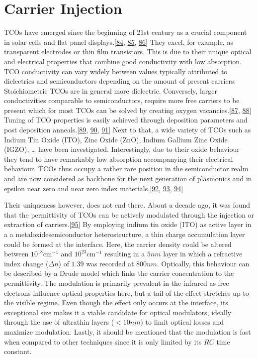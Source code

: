 \documentclass[a4paper,10pt,english,openany,oneside]{jupyterBook}
\begin{document}
\section{Carrier Injection}
\label{\detokenize{sota:carrier-injection}}
\sphinxAtStartPar
TCOs have emerged since the beginning of 21st century as a crucial component in solar cells and flat panel displays.{[}\hyperlink{cite.bib:id444}{84}, \hyperlink{cite.bib:id446}{85}, \hyperlink{cite.bib:id448}{86}{]} They excel, for example, as transparent electrodes or thin film transistors. This is due to their unique optical and electrical properties that combine good conductivity with low absorption. TCO conductivity can vary widely between values typically attributed to dielectrics and semiconductors depending on the amount of present carriers. Stoichiometric TCOs are in general more dielectric. Conversely, larger conductivities comparable to semiconductors, require more free carriers to be present which for most TCOs can be solved by creating oxygen vacancies.{[}\hyperlink{cite.bib:id339}{87}, \hyperlink{cite.bib:id341}{88}{]} Tuning of TCO properties is easily achieved through deposition parameters and post deposition anneals.{[}\hyperlink{cite.bib:id338}{89}, \hyperlink{cite.bib:id498}{90}, \hyperlink{cite.bib:id334}{91}{]} Next to that, a wide variety of TCOs such as Indium Tin Oxide (ITO), Zinc Oxide (ZnO), Indium Gallium Zinc Oxide (IGZO), … have been investigated. Interestingly, due to their oxide behaviour they tend to have remarkably low absorption accompanying their electrical behaviour. TCOs thus occupy a rather rare position in the semiconductor realm and are now considered as backbone for the next generation of plasmonics and in epsilon near zero and near zero index materials.{[}\hyperlink{cite.bib:id86}{92}, \hyperlink{cite.bib:id445}{93}, \hyperlink{cite.bib:id447}{94}{]}

\sphinxAtStartPar
Their uniqueness however, does not end there. About a decade ago, it was found that the permittivity of TCOs can be actively modulated through the injection or extraction of carriers.{[}\hyperlink{cite.bib:id472}{95}{]} By employing indium tin oxide (ITO) as active layer in a a metal\sphinxhyphen{}oxide\sphinxhyphen{}semiconductor heterostructure, a thin charge accumulation layer could be formed at the interface. Here, the carrier density could be altered between \(10^{18}\)cm\(^{-1}\) and \(10^{23}\)cm\(^{-1}\) resulting in a \(5nm\) layer in which a refractive index change (\(\Delta n\)) of \(1.39\) was recorded at \(800nm\). Optically, this behaviour can be described by a Drude model which links the carrier concentration to the permittivity. The modulation is primarily prevalent in the infrared as free electrons influence optical properties here, but a tail of the effect stretches up to the visible regime.  Even though the effect only occurs at the interface, its exceptional size makes it a viable candidate for optical modulators, ideally through the use of ultra\sphinxhyphen{}thin layers (\(<10nm\)) to limit optical losses and maximize modulation. Lastly, it should be mentioned that the modulation is fast when compared to other techniques since it is only limited by its \(RC\) time constant.
\end{document}
